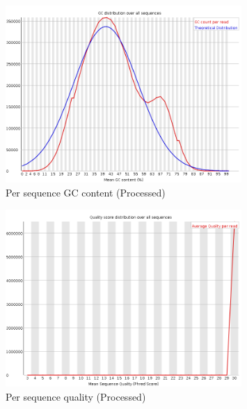 \documentclass[UTF8]{ctexart}
\begin{document}
\clearpage

\begin{figure}[!htb]
	\centering
	\includegraphics[width=0.8\textwidth]{img/SRR14325859_FastQC_Processed_img/per_sequence_gc_content.png}	%
	\caption{Per sequence GC content (Processed)\protect}    %
\end{figure}

\begin{figure}[!htb]
	\centering
	\includegraphics[width=0.8\textwidth]{img/SRR14325859_FastQC_Processed_img/per_sequence_quality.png}	%
	\caption{Per sequence quality (Processed)\protect}    %
\end{figure}

\clearpage
\end{document}
